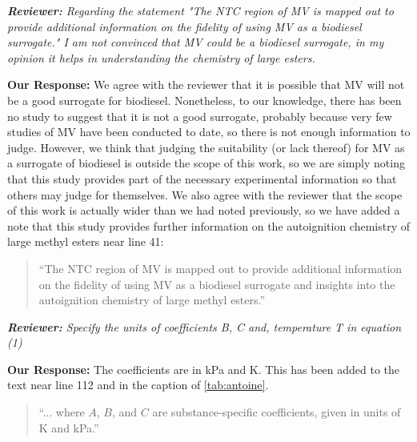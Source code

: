 \documentclass{article}
\newenvironment{reviewer}{\vspace{0.5\baselineskip}\begingroup\itshape\textbf{Reviewer:}}{\endgroup\vspace{0.5\baselineskip}}
\newenvironment{response}{\vspace{0.5\baselineskip}\textbf{Our Response:}}{\vspace{0.5\baselineskip}}
\begin{document}
\begin{reviewer}
    Regarding the statement "The NTC region of MV is mapped out to provide additional information on
    the fidelity of using MV as a biodiesel surrogate." I am not convinced that MV could be a
    biodiesel surrogate, in my opinion it helps in understanding the chemistry of large esters.
\end{reviewer}

\begin{response}
    We agree with the reviewer that it is possible that MV will not be a good surrogate for
    biodiesel. Nonetheless, to our knowledge, there has been no study to suggest that it is not a
    good surrogate, probably because very few studies of MV have been conducted to date, so there is
    not enough information to judge. However, we think that judging the suitability (or lack
    thereof) for MV as a surrogate of biodiesel is outside the scope of this work, so we are simply
    noting that this study provides part of the necessary experimental information so that others
    may judge for themselves. We also agree with the reviewer that the scope of this work is
    actually wider than we had noted previously, so we have added a note that this study provides
    further information on the autoignition chemistry of large methyl esters near line 41:

    \begin{quote}
        ``The NTC region of MV is mapped out to provide additional information on the fidelity of
        using MV as a biodiesel surrogate and insights into the autoignition chemistry of large
        methyl esters.''
    \end{quote}
\end{response}

\begin{reviewer}
    Specify the units of coefficients B, C  and, temperature T in equation (1)
\end{reviewer}

\begin{response}
    The coefficients are in \si{kPa} and \si{\kelvin}. This has been added to the text near line
    112 and in the caption of \cref{tab:antoine}.
    \begin{quote}
        ``... where \(A\), \(B\), and \(C\) are substance-specific coefficients, given in units of
        \si{\kelvin} and \si{\kPa}.''
    \end{quote}
\end{response}
\end{document}
